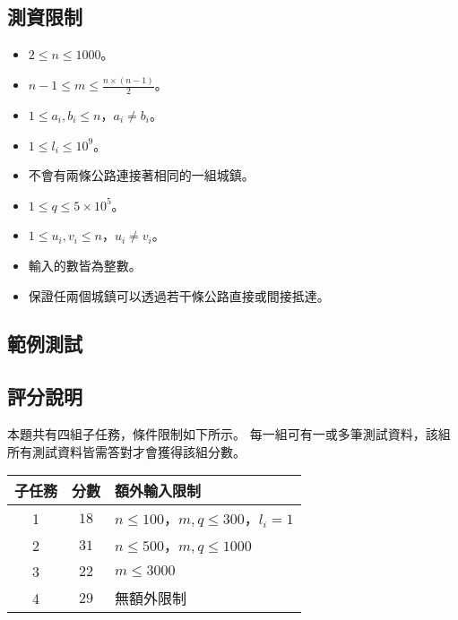 \subsection{測資限制}

\begin{itemize}
\tightlist
\item
  \(2 \le n \le 1000\)。
\item
  \(n - 1 \le m \le \displaystyle\frac{n\times (n-1)}{2}\)。
\item
  \(1 \le a_i, b_i \le n\)，\(a_i \ne b_i\)。
\item
  \(1 \le l_i \le 10^9\)。
\item
  不會有兩條公路連接著相同的一組城鎮。
\item
  \(1 \le q \le 5\times 10^5\)。
\item
  \(1 \le u_i, v_i \le n\)，\(u_i \ne v_i\)。
\item
  輸入的數皆為整數。
\item
  保證任兩個城鎮可以透過若干條公路直接或間接抵達。
\end{itemize}

\subsection{範例測試}

\begin{example}
%
\end{example}

\subsection{評分說明}

本題共有四組子任務，條件限制如下所示。
每一組可有一或多筆測試資料，該組所有測試資料皆需答對才會獲得該組分數。

\begin{longtable}[]{@{}ccl@{}}
\toprule
子任務 & 分數 & 額外輸入限制 \\
\midrule
\endhead
1 & \(18\) & \(n \le 100\)，\(m, q \le 300\)，\(l_i = 1\) \\
2 & \(31\) & \(n \le 500\)，\(m, q \le 1000\) \\
3 & \(22\) & \(m\le 3000\) \\
4 & \(29\) & 無額外限制 \\
\bottomrule
\end{longtable}
